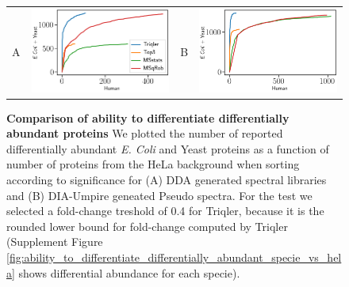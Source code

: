 \documentclass[10pt,letterpaper]{article}
\begin{document}
\begin{figure}[hbt]
    \centering
    \begin{tabular}{lclc} 

        A & \includegraphics[width=0.45\linewidth]{../../result/report_plots/osw_de_human_vs_ecoli_and_yeast.png} & 
        B & \includegraphics[width=0.45\linewidth]{../../result/report_plots/diann_de_human_vs_ecoli_and_yeast.png} \\ 

    \end{tabular}
    \caption{{\bf Comparison of ability to differentiate differentially abundant proteins} We plotted the number of reported differentially abundant  {\em E. Coli} and Yeast proteins as a function of number of proteins from the HeLa background when sorting according to significance for (A) DDA generated spectral libraries and (B) DIA-Umpire geneated Pseudo spectra. For the test we selected a fold-change treshold of 0.4 for Triqler, because it is the rounded lower bound for fold-change computed by Triqler (Supplement Figure \ref{fig:ability_to_differentiate_differentially_abundant_specie_vs_hela} shows differential abundance for each specie). \label{fig:diff_vs_hela}}
\end{figure}
\end{document}
